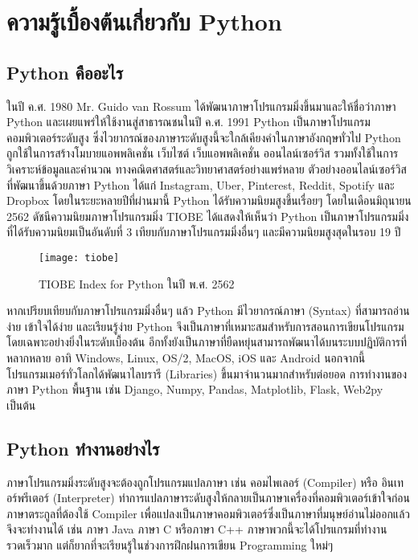 \chapter{ความรู้เบื้องต้นเกี่ยวกับ Python}

\section{Python คืออะไร}

ในปี ค.ศ. 1980 Mr. Guido van Rossum ได้พัฒนาภาษาโปรแกรมมิ่งขึ้นมาและให้ชื่อว่าภาษา Python และเผยแพร่ให้ใช้งานสู่สาธารณชนในปี ค.ศ. 1991 \cite{Gui19} Python เป็นภาษาโปรแกรมคอมพิวเตอร์ระดับสูง ซึ่งไวยากรณ์ของภาษาระดับสูงนี้จะใกล้เคียงคำในภาษาอังกฤษทั่วไป \cite{All15}  Python ถูกใช้ในการสร้างโมบายแอพพลิเคชั่น เว็บไซต์ เว็บแอพพลิเคชั่น ออนไลน์เซอร์วิส รวมทั้งใช้ในการวิเคราะห์ข้อมูลและคำนวณ ทางคณิตศาสตร์และวิทยาศาสตร์อย่างแพร่หลาย  ตัวอย่างออนไลน์เซอร์วิสที่พัฒนาขึ้นด้วยภาษา Python ได้แก่ Instagram, Uber, Pinterest, Reddit, Spotify และ Dropbox \cite{Shu19} โดยในระยะหลายปีที่ผ่านมานี้ Python ได้รับความนิยมสูงขึ้นเรื่อยๆ โดยในเดือนมิถุนายน 2562 ดัชนีความนิยมภาษาโปรแกรมมิ่ง TIOBE ได้แสดงให้เห็นว่า Python เป็นภาษาโปรแกรมมิ่งที่ได้รับความนิยมเป็นอันดับที่ 3 เทียบกับภาษาโปรแกรมมิ่งอื่นๆ และมีความนิยมสูงสุดในรอบ 19 ปี \cite{TIO19}  

\begin{figure}[h]
\caption{TIOBE Index for Python ในปี พ.ศ. 2562}
\texttt{[image: tiobe]}
\centering
\end{figure}

หากเปรียบเทียบกับภาษาโปรแกรมมิ่งอื่นๆ แล้ว Python มีไวยากรณ์ภาษา (Syntax) ที่สามารถอ่านง่าย เข้าใจได้ง่าย และเรียนรู้ง่าย Python จึงเป็นภาษาที่เหมาะสมสำหรับการสอนการเขียนโปรแกรมโดยเฉพาะอย่างยิ่งในระดับเบื้องต้น อีกทั้งยังเป็นภาษาที่ยืดหยุ่นสามารถพัฒนาได้บนระบบปฏิบัติการที่หลากหลาย อาทิ  Windows, Linux, OS/2, MacOS, iOS และ Android นอกจากนี้โปรแกรมเมอร์ทั่วโลกได้พัฒนาไลบรารี (Libraries) ขึ้นมาจำนวนมากสำหรับต่อยอด การทำงานของภาษา Python พื้นฐาน เช่น Django, Numpy, Pandas, Matplotlib, Flask, Web2py เป็นต้น \cite{Pyt19}

\section{Python ทำงานอย่างไร}

ภาษาโปรแกรมมิ่งระดับสูงจะต้องถูกโปรแกรมแปลภาษา เช่น คอมไพเลอร์ (Compiler) หรือ อินเทอร์พรีเตอร์ (Interpreter) ทำการแปลภาษาระดับสูงให้กลายเป็นภาษาเครื่องที่คอมพิวเตอร์เข้าใจก่อน \cite{Mar13} ภาษาตระกูลที่ต้องใช้ Compiler เพื่อแปลงเป็นภาษาคอมพิวเตอร์ซึ่งเป็นภาษาที่มนุษย์อ่านไม่ออกแล้วจึงจะทำงานได้ เช่น ภาษา Java ภาษา C หรือภาษา C++ ภาษาพวกนี้จะได้โปรแกรมที่ทำงานรวดเร็วมาก แต่ก็ยากที่จะเรียนรู้ในช่วงการฝึกฝนการเขียน Programming ใหม่ๆ \cite{Pau16}

